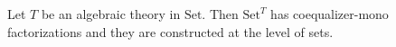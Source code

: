 Let $T$ be an algebraic theory in $\text{Set}$. Then $\text{Set}^T$ has coequalizer-mono factorizations and they are constructed at the level of sets.
